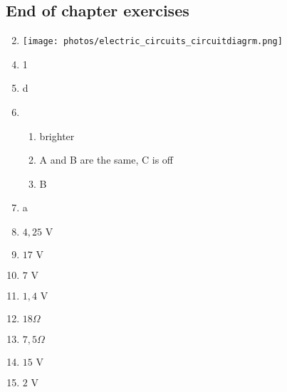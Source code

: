 \subsection{End of chapter exercises}
\begin{enumerate}[noitemsep, label=\textbf{(\arabic*)} ]
\setcounter{enumi}{1}
 \item \texttt{[image: photos/electric\_circuits\_circuitdiagrm.png]}
\end{enumerate}
\begin{multicols}{3}
 \begin{enumerate}[noitemsep, label=\textbf{(\arabic*)} ]
\setcounter{enumi}{3}
\item 1
\item d
\item 
 \begin{enumerate}[noitemsep, label=\textbf{(\alph*)} ]
\item brighter
\item A and B are the same, C is off
\item B
\end{enumerate}
\item a
\item $4,25 \text{ V}$
\item $17 \text{ V}$
\item $7 \text{ V}$
\item $1,4 \text{ V}$
\item $18 \Omega$
\item $7,5 \Omega$
\item $15 \text{ V}$
\item $2 \text{ V}$
 \end{enumerate}
\end{multicols}

